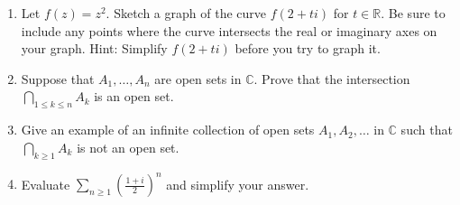 \documentclass[11pt]{article}
\newcommand{\ds}{\displaystyle}
\newcommand{\R}{\mathbb{R}}
\newcommand{\C}{\mathbb{C}}
\begin{document}
\begin{enumerate}
\newpage
\item Let $f(z) = z^2$.  Sketch a graph of the curve $f(2+ti)$ for $t \in \R$. Be sure to include any points where the curve intersects the real or imaginary axes on your graph. Hint: Simplify $f(2+ti)$ before you try to graph it. 
\vfill



\item Suppose that $A_1, \ldots, A_n$ are open sets in $\C$.  Prove that the intersection $\bigcap_{1 \le k \le n} A_k$ is an open set.  
\vfill

\item Give an example of an infinite collection of open sets $A_1, A_2, \ldots$ in $\C$ such that $\bigcap_{k \ge 1} A_k$ is not an open set. 
\vfill 

\item Evaluate $\ds \sum_{n \ge 1} \left( \frac{1+i}{2} \right)^n$ and simplify your answer. 
\vfill
 
\end{enumerate}
\end{document}
